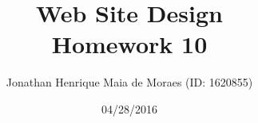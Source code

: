 \title{Web Site Design \\ Homework 10}
\author{Jonathan Henrique Maia de Moraes (ID: 1620855)}
\date{04/28/2016}
\maketitle
